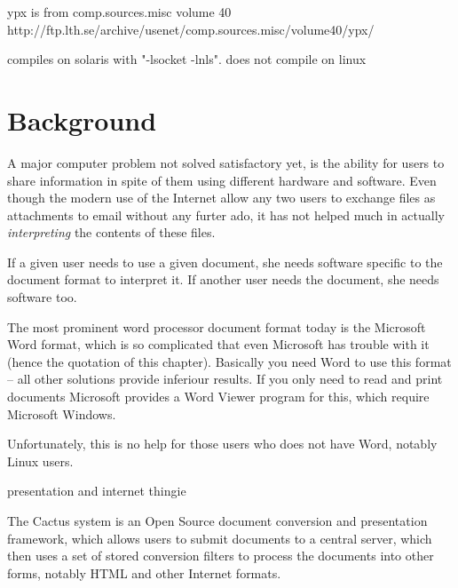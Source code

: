 














ypx is from comp.sources.misc volume 40
http://ftp.lth.se/archive/usenet/comp.sources.misc/volume40/ypx/

compiles on solaris with "-lsocket -lnls".  does not compile on linux



\section{Background}

A major computer problem not solved satisfactory yet, is the ability
for users to share information in spite of them using different
hardware and software.   Even though the modern use of the Internet
allow any two users to exchange files as attachments to
email
without any furter ado, it has not helped much in actually \textit{interpreting} the
contents of these files.

If a given user needs to use a given document, she needs software
specific to the document format to interpret it.  If another user
needs the document, she needs software too.

The most prominent word processor document format today is the
Microsoft Word format, which is so complicated that even Microsoft has
trouble with it (hence the quotation of this chapter).  Basically you
need Word to use this format -- all other solutions provide inferiour
results.  If you only need to read and print documents Microsoft
provides a Word Viewer program for this, which require Microsoft
Windows.

Unfortunately, this is no help for those users who does not have Word,
notably Linux users.

\textsf{presentation and internet thingie}




The Cactus system is an Open Source document conversion and
presentation framework, which allows users to submit documents to a
central server, which then uses a set of stored conversion filters to
process the documents into other forms, notably HTML and other
Internet formats.


